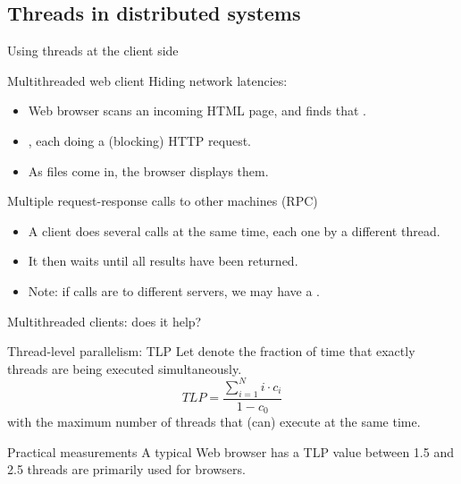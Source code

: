 \subsection{Threads in distributed systems}
\begin{slide}{Using threads at the client side}
  \begin{block}{Multithreaded web client}
    Hiding network latencies:
    \begin{itemize}\tightlist
    \item Web browser scans an incoming HTML page, and finds that .
    \item {}, each doing a (blocking) HTTP request.
    \item As files come in, the browser displays them.
    \end{itemize}
  \end{block}
  \begin{block}{Multiple request-response calls to other machines (RPC)}
    \begin{itemize}\tightlist
    \item A client does several calls at the same time, each one by a different thread.
    \item It then waits until all results have been returned.
    \item Note: if calls are to different servers, we may have a .
    \end{itemize}
  \end{block}
\end{slide}
  \begin{slide}{Multithreaded clients: does it help?}
    \begin{block}{Thread-level parallelism: TLP}
      Let  denote the fraction of time that exactly  threads are being executed
      simultaneously.
      \[ TLP = \frac{\sum_{i=1}^N i \cdot c_i}{1- c_0} \]
      with  the maximum number of threads that (can) execute at the same time. 
    \end{block}
    \begin{block}{Practical measurements}
      A typical Web browser has a TLP value between 1.5 and 2.5 \mathexpr{\Rightarrow} threads are primarily
      used for  browsers.
    \end{block}
  \end{slide}
